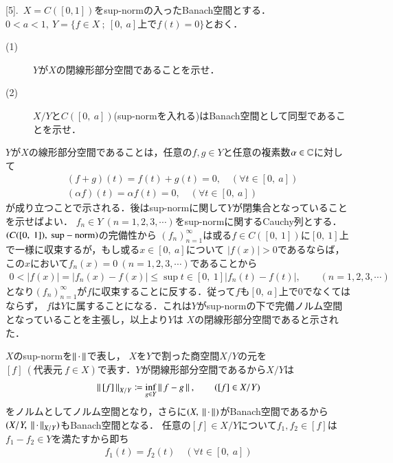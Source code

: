 [5].\ $X=C([0,1])$をsup-normの入ったBanach空間とする．$0 < a <1,\ Y=\{f \in X\ ;\ [0,\ a]\mbox{上で}f(t)=0\}$とおく．
\begin{description}
	\item[(1)] $Y$が$X$の閉線形部分空間であることを示せ．
	\item[(2)] $X/Y$と$C([0,\ a])$(sup-normを入れる)はBanach空間として同型であることを示せ．
\end{description}

\begin{prf}
\begin{description}\mbox{}
	\item[(1)]
		$Y$が$X$の線形部分空間であることは，任意の$f,g \in Y$と任意の複素数$\alpha \in \mathbb{C}$に対して
		\begin{align}
			&(f+g)(t) = f(t) + g(t) = 0, \quad (\forall t \in [0,\ a]) \\
			&(\alpha f) (t) = \alpha f(t) = 0, \quad (\forall t \in [0,\ a])
		\end{align}
		が成り立つことで示される．後はsup-normに関して$Y$が閉集合となっていることを示せばよい．
		$f_n \in Y\ (n=1,2,3,\cdots)$をsup-normに関するCauchy列とする．$(C([0,\ 1]),\ \rm{sup-norm})$の完備性から
		$(f_n)_{n=1}^{\infty}$は或る$f \in C([0,\ 1])$に$[0,\ 1]$上で一様に収束するが，もし或る$x \in [0,\ a]$について
		$|f(x)| > 0$であるならば，この$x$において$f_n(x)=0\ (n=1,2,3,\cdots)$であることから
		\begin{align}
			0 < |f(x)| = |f_n(x) - f(x)| \leq \sup{t \in [0,\ 1]}{|f_n(t) - f(t)|}, \qquad (n=1,2,3,\cdots)
		\end{align}
		となり$(f_n)_{n=1}^{\infty}$が$f$に収束することに反する．従って$f$も$[0,\ a]$上で0でなくてはならず，
		$f$は$Y$に属することになる．これは$Y$がsup-normの下で完備ノルム空間となっていることを主張し，以上より$Y$は
		$X$の閉線形部分空間であると示された．
	\item[(2)]
		$X$のsup-normを$\left\|\, \cdot\, \right\|_{}$で表し，
		$X$を$Y$で割った商空間$X/Y$の元を$[f]\ (\mbox{代表元}\ f \in X)$で表す．$Y$が閉線形部分空間であるから$X/Y$は
		\begin{align}
			\left\|\, [f]\, \right\|_{X/Y} \coloneqq \operatorname*{inf}_{g \in Y} \left\|\, f - g\, \right\|_{},\qquad ([f] \in X/Y)
		\end{align}
		をノルムとしてノルム空間となり，さらに$(X,\ \Norm{\cdot}{})$がBanach空間であるから$(X/Y,\ \Norm{\cdot}{X/Y})$もBanach空間となる．
		任意の$[f] \in X/Y$について$f_1, f_2 \in [f]$は$f_1 - f_2 \in Y$を満たすから即ち
		\begin{align}
			f_1(t) = f_2(t) \quad (\forall t \in [0,\ a])

\end{align}
\end{description}
\end{prf}
